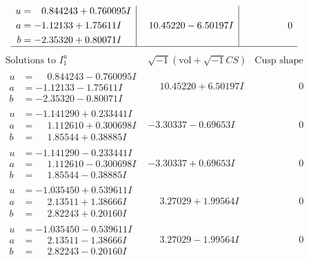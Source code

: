 \documentclass[1p]{elsarticle_modified}
\theoremstyle{definition}
\newcommand{\I}{\sqrt{-1}}
\begin{document}
$$\begin{array}{c|c|c}
\begin{aligned}
u &= \phantom{-}0.844243 + 0.760095 I \\
a &= -1.12133 + 1.75611 I \\
b &= -2.35320 + 0.80071 I\end{aligned}
 & \phantom{-}10.45220 - 6.50197 I & \phantom{-0.000000 } 0\\
 \hline 
 \end{array}$$\newpage$$\begin{array}{c|c|c}  
\text{Solutions to }I^u_{1}& \I (\text{vol} + \sqrt{-1}CS) & \text{Cusp shape}\\
 \hline 
\begin{aligned}
u &= \phantom{-}0.844243 - 0.760095 I \\
a &= -1.12133 - 1.75611 I \\
b &= -2.35320 - 0.80071 I\end{aligned}
 & \phantom{-}10.45220 + 6.50197 I & \phantom{-0.000000 } 0 \\ \hline\begin{aligned}
u &= -1.141290 + 0.233441 I \\
a &= \phantom{-}1.112610 + 0.300698 I \\
b &= \phantom{-}1.85544 + 0.38885 I\end{aligned}
 & -3.30337 - 0.69653 I & \phantom{-0.000000 } 0 \\ \hline\begin{aligned}
u &= -1.141290 - 0.233441 I \\
a &= \phantom{-}1.112610 - 0.300698 I \\
b &= \phantom{-}1.85544 - 0.38885 I\end{aligned}
 & -3.30337 + 0.69653 I & \phantom{-0.000000 } 0 \\ \hline\begin{aligned}
u &= -1.035450 + 0.539611 I \\
a &= \phantom{-}2.13511 + 1.38666 I \\
b &= \phantom{-}2.82243 + 0.20160 I\end{aligned}
 & \phantom{-}3.27029 + 1.99564 I & \phantom{-0.000000 } 0 \\ \hline\begin{aligned}
u &= -1.035450 - 0.539611 I \\
a &= \phantom{-}2.13511 - 1.38666 I \\
b &= \phantom{-}2.82243 - 0.20160 I\end{aligned}
 & \phantom{-}3.27029 - 1.99564 I & \phantom{-0.000000 } 0 \\ \hline\begin{aligned}

\end{aligned}
\end{array}$$
\end{document}
